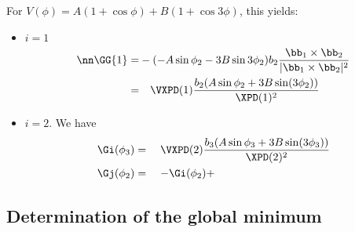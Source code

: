 For $V(\phi)=A(1+\cos\phi)+B(1+\cos{3\phi})$, this yields:
\begin{itemize}
\item $i=1$ 
\begin{align}
  \nn\GG{1}=& -(-A\sin\phi_2-3B\sin{3\phi_2})
  b_2\frac{\bb_1\times\bb_2}{|\bb_1\times\bb_2|^2}\\
  =&\quad\VXPD(1)\frac{b_2(A\sin\phi_2+3B\sin(3\phi_2))}{\XPD(1)^2}
\end{align}
\item $i=2$. We have
  \begin{align}
    \Gi(\phi_3)&=\quad\VXPD(2)\frac{b_3(A\sin\phi_3+3B\sin(3\phi_3))}{\XPD(2)^2}\\
    \Gj(\phi_2)&=\quad -\Gi(\phi_2)+
  \end{align}
\end{itemize}

\subsection{Determination of the global minimum}


